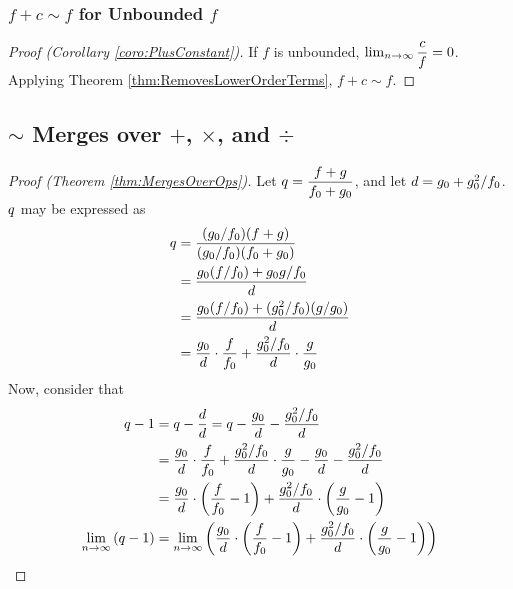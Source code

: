 \subsubsection{$f + c \sim f$ for Unbounded $f$}

\begin{proof}[Proof (Corollary \ref{coro:PlusConstant})]
	If $f$ is unbounded, $\lim_{n \to \infty} \dfrac{c}{f} = 0$. Applying Theorem \ref{thm:RemovesLowerOrderTerms}, $f + c \sim f$.
\end{proof}

\subsection{$\sim$ Merges over $+$, $\times$, and $\div$}

\begin{proof}[Proof (Theorem \ref{thm:MergesOverOps})]
	Let $q = \dfrac{f + g}{f_0 + g_0}$, and let $d = g_0 + g_0^2 / f_0$. $q$ may be expressed as
	\begin{align*}
	q &= \frac{(g_0 / f_0)(f + g)}{(g_0 / f_0)(f_0 + g_0)}\\
	&= \frac{g_0(f / f_0) + g_0g / f_0}{d}\\
	&= \frac{g_0(f / f_0) + (g_0^2 / f_0)(g / g_0)}{d}\\
	&= \frac{g_0}{d} \cdot \frac{f}{f_0} + \frac{g_0^2 / f_0}{d} \cdot \frac{g}{g_0}
	\end{align*}
	Now, consider that
	\begin{align*}
	\FuncQuotient - 1 &= \FuncQuotient - \frac{\FuncDenom}{\FuncDenom} = \FuncQuotient - \frac{\Tweak{g}}{\FuncDenom} - \frac{\Tweak{g}^2 / \Tweak{f}}{\FuncDenom}\\
	&= \frac{\Tweak{g}}{d} \cdot \frac{f}{\Tweak{f}} + \frac{\Tweak{g}^2 / \Tweak{f}}{\FuncDenom} \cdot \frac{g}{\Tweak{g}} - \frac{\Tweak{g}}{\FuncDenom} - \frac{\Tweak{g}^2 / \Tweak{f}}{\FuncDenom}\\
	&= \frac{\Tweak{g}}{d} \cdot \left( \frac{f}{\Tweak{f}} - 1 \right) + \frac{\Tweak{g}^2 / \Tweak{f}}{\FuncDenom} \cdot \left( \frac{g}{\Tweak{g}} - 1 \right)\\
	\ExprNToInfty \left( \FuncQuotient - 1 \right) &= \ExprNToInfty \left( \frac{\Tweak{g}}{d} \cdot \left( \frac{f}{\Tweak{f}} - 1 \right) + \frac{\Tweak{g}^2 / \Tweak{f}}{\FuncDenom} \cdot \left( \frac{g}{\Tweak{g}} - 1 \right) \right)\\

\end{align*}
\end{proof}
